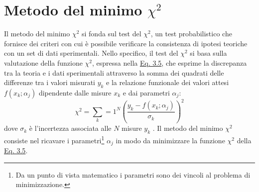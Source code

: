 \documentclass[12pt,a4paper,twoside]{report}
\begin{document}
	\section{Metodo del minimo \texorpdfstring{$\chi^2$}{chi}}
	Il metodo del minimo $\chi^2$ si fonda sul test del $\chi^2$, un test probabilistico che fornisce dei criteri con cui è possibile verificare la consistenza di ipotesi teoriche con un set di dati sperimentali. Nello specifico, il test del $\chi^2$ si basa sulla valutazione della funzione $\chi^2$, espressa nella \hyperref[eq:chi_square_method]{Eq. 3.5}, che esprime la discrepanza tra la teoria e i dati sperimentali attraverso la somma dei quadrati delle differenze tra i valori misurati $y_k$ e la relazione funzionale dei valori attesi $f\left(x_k;\alpha_j\right)$ dipendente dalle misure $x_k$ e dai parametri $\alpha_j$:
	\begin{equation}
		\chi^2=\sum_k=1^N\left(\frac{y_k-f\left(x_k;\alpha_j\right)}{\sigma_k}\right)^2
		\label{eq:chi_square_method}
	\end{equation}
	dove $\sigma_k$ è l'incertezza associata alle $N$ misure $y_k$ \cite{Fornasini2008}. Il metodo del minimo $\chi^2$ consiste nel ricavare i parametri\footnote{Da un punto di vista matematico i parametri sono dei vincoli al problema di minimizzazione.} $\alpha_j$ in modo da minimizzare la funzione $\chi^2$ della \hyperref[eq:chi_square_method]{Eq. 3.5}.
	
\end{document}
